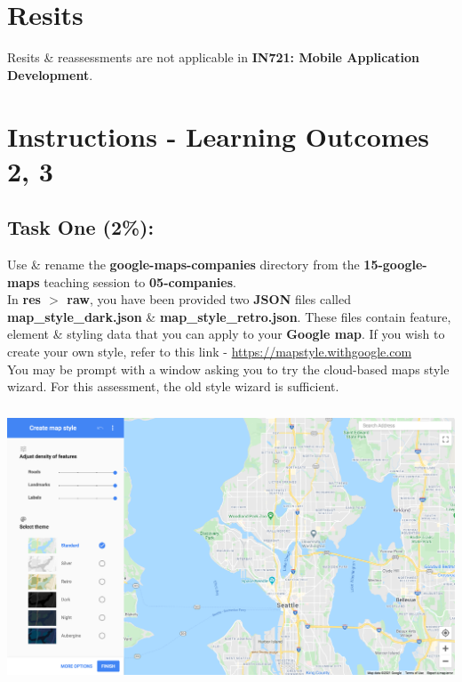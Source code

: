 \documentclass{article}
\begin{document}
\section*{Resits}
Resits \& reassessments are not applicable in \textbf{IN721: Mobile Application Development}.

\newpage

\section*{Instructions - Learning Outcomes 2, 3}
\subsection*{Task One (2\%):}
Use \& rename the \textbf{google-maps-companies} directory from the \textbf{15-google-maps} teaching session to \textbf{05-companies}. \\

In \textbf{res $>$ raw}, you have been provided two \textbf{JSON} files called \textbf{map\_style\_dark.json} \& \textbf{map\_style\_retro.json}. These files contain feature, element \& styling data that you can apply to your \textbf{Google map}. If you wish to create your own style, refer to this link - \href{https://mapstyle.withgoogle.com}{https://mapstyle.withgoogle.com} \\

You may be prompt with a window asking you to try the cloud-based maps style wizard. For this assessment, the old style wizard is sufficient. \\

\includegraphics[width=15cm, height=9cm]{../../resources/img/practicals/05-companies-1.png} \\
\end{document}
